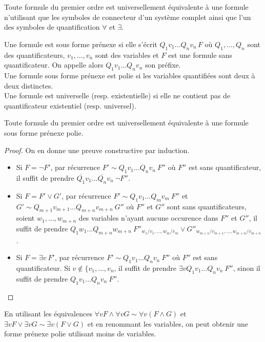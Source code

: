 \documentclass[a4paper]{article}
\begin{document}
\begin{theorem}
  Toute formule du premier ordre est universellement équivalente à une formule n'utilisant que les symboles de connecteur d'un système complet ainsi que l'un des symboles de quantification $\forall$ et $\exists$.
\end{theorem}

Une formule est sous forme prénexe si elle s'écrit $Q_1v_1\dots Q_nv_n\, F$ où $Q_1,\dots,Q_n$ sont des quantificateurs, $v_1,\dots,v_n$ sont des variables et $F$ est une formule sans quantificateur. On appelle alors $Q_1v_1\dots Q_nv_n$ son préfixe.\\
Une formule sous forme prénexe est polie si les variables quantifiées sont deux à deux distinctes.\\
Une formule est universelle (resp. existentielle) si elle ne contient pas de quantificateur existentiel (resp. universel).

\begin{theorem}
  Toute formule du premier ordre est universellement équivalente à une formule sous forme prénexe polie.
\end{theorem}

\begin{proof}
  On en donne une preuve constructive par induction.
  \begin{itemize}
  \item Si $F = \neg F'$, par récurrence $F' \sim Q_1v_1\dots Q_nv_n\ F''$ où $F''$ est sans quantificateur, il suffit de prendre $\overline{Q_1}v_1\dots\overline{Q_n}v_n\ \neg F''$.
  \item Si $F = F' \vee G'$, par récurrence $F' \sim Q_1v_1\dots Q_mv_m\ F''$ et $G' \sim Q_{m+1}v_{m+1}\dots Q_{m+n}v_{m+n}\ G''$ où $F''$ et $G''$ sont sans quantificateurs, soient $w_1,\dots,w_{m+n}$ des variables n'ayant aucune occurence dans $F''$ et $G''$, il suffit de prendre $Q_1w_1\dots Q_{m+n}w_{m+n}\ F''_{w_1/v_1,\dots,w_m/v_m} \vee G''_{w_{m+1}/v_{m+1},\dots,w_{m+n}/v_{m+n}}$.
  \item Si $F = \exists v\ F'$, par récurrence $F' \sim Q_1v_1\dots Q_nv_n\ F''$ où $F''$ est sans quantificateur. Si $v \not\in \{v_1,\dots,v_n$, il suffit de prendre $\exists v Q_1v_1\dots Q_nv_n\ F''$, sinon il suffit de prendre $Q_1v_1\dots Q_nv_n\ F''$.
  \end{itemize}
\end{proof}

\begin{remark}
  En utilisant les équivalences $\forall v F \wedge \forall v G \sim \forall v (F \wedge G)$ et $\exists v F \vee \exists v G \sim \exists v (F \vee G)$ et en renommant les variables, on peut obtenir une forme prénexe polie utilisant moins de variables.
\end{remark}
\end{document}

